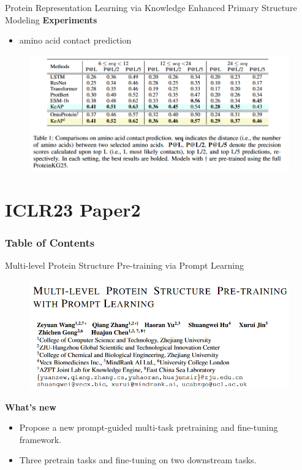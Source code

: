 \documentclass[notheorems, aspectratio=54]{beamer}
\begin{document}
\begin{frame}{Protein Representation Learning via Knowledge Enhanced Primary Structure Modeling}
  \textbf{Experiments}
  \begin{itemize}
      \item amino acid contact prediction
  \end{itemize}
  \begin{figure}[!h]
    \centering
    \includegraphics[width=1\linewidth]{figures/PRL-tab1.png}
  \end{figure}
\end{frame}


\section{ICLR23 Paper2}
\begin{frame}
    \frametitle{Table of Contents}
    \tableofcontents[currentsection]
\end{frame}

\begin{frame}{Multi-level Protein Structure Pre-training via Prompt Learning}
  \begin{figure}[!h]
    \centering
    \includegraphics[width=0.85\linewidth]{figures/MPH-title.png}
  \end{figure}
  \textbf{What's new}
  \begin{itemize}
    \item Propose a new prompt-guided multi-task pretraining and fine-tuning framework.
    \item Three pretrain tasks and fine-tuning on two downstream tasks.  
  \end{itemize}

\end{frame}
\end{document}
